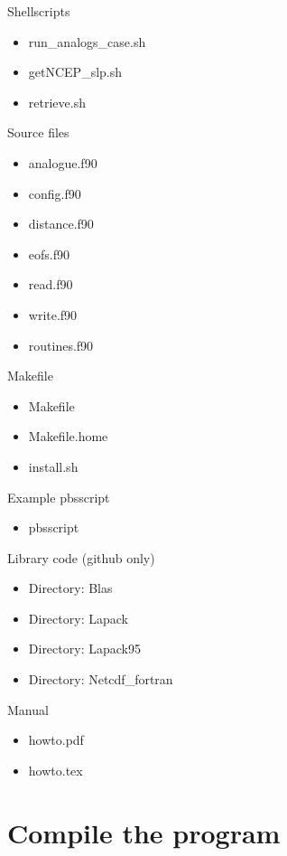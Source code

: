 \documentclass[11p,a4paper]{article}
\begin{document}
Shellscripts
\begin{itemize}
 \item run\_analogs\_case.sh
 \item getNCEP\_slp.sh 
 \item retrieve.sh
\end{itemize}
Source files
\begin{itemize}
 \item analogue.f90  
 \item config.f90  
 \item distance.f90  
 \item eofs.f90  
 \item read.f90  
 \item write.f90
 \item routines.f90 
\end{itemize}
Makefile
\begin{itemize}
 \item Makefile
 \item Makefile.home
 \item install.sh
\end{itemize}
Example pbsscript
\begin{itemize}
 \item pbsscript
\end{itemize}
Library code (github only)
\begin{itemize}
 \item Directory: Blas
 \item Directory: Lapack
 \item Directory: Lapack95
 \item Directory: Netcdf\_fortran
\end{itemize}
Manual
\begin{itemize}
 \item howto.pdf
 \item howto.tex
\end{itemize}

\section{Compile the program}
\label{sec:compil}
\end{document}
